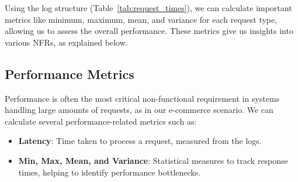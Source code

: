 Using the log structure (Table~\ref{tab:request_times}), we can calculate important metrics like minimum, maximum, mean, and variance for each request type, allowing us to assess the overall performance. These metrics give us insights into various NFRs, as explained below.

\subsection{Performance Metrics}

Performance is often the most critical non-functional requirement in systems handling large amounts of requests, as in our e-commerce scenario. We can calculate several performance-related metrics such as:

\begin{itemize}
    \item \textbf{Latency}: Time taken to process a request, measured from the logs.
    \item \textbf{Min, Max, Mean, and Variance}: Statistical measures to track response times, helping to identify performance bottlenecks.
\end{itemize}

\begin{table}[h!]
    \centering
    \renewcommand{\arraystretch}{1.5}
    \caption{Non-functional requirements results: Performance Analysis}
    \label{tab:request_statistics}
\end{table}


